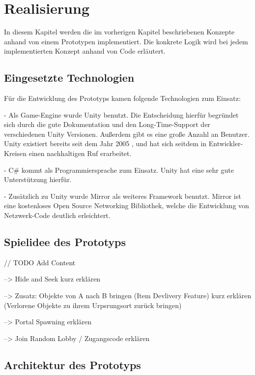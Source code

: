 \chapter{Realisierung}
\label{sec:realisierung}

In diesem Kapitel werden die im vorherigen Kapitel beschriebenen Konzepte anhand von einem Prototypen implementiert. Die konkrete Logik wird bei jedem implementierten Konzept anhand von Code erläutert.

\section{Eingesetzte Technologien}

Für die Entwicklung des Prototyps kamen folgende Technologien zum Einsatz:

- Als Game-Engine wurde Unity\cite{Technologies.03.02.2022} benutzt. Die Entscheidung hierfür begründet sich durch die gute Dokumentation und den Long-Time-Support der verschiedenen Unity Versionen. Außerdem gibt es eine große Anzahl an Benutzer. Unity existiert bereits seit dem Jahr 2005 \cite{Wikipedia.2022c}, und hat sich seitdem in Entwickler-Kreisen einen nachhaltigen Ruf erarbeitet.

- C\# kommt als Programmiersprache zum Einsatz. Unity hat eine sehr gute Unterstützung hierfür.

- Zusätzlich zu Unity wurde Mirror\cite{.03.02.2022} als weiteres Framework benutzt. Mirror ist eine kostenloses Open Source Networking Bibliothek, welche die Entwicklung von Netzwerk-Code deutlich erleichtert.

\section{Spielidee des Prototyps}
\label{Spielidee}

// TODO Add Content

--> Hide and Seek kurz erklären

--> Zusatz: Objekte von A nach B bringen (Item Devlivery Feature) kurz erklären (Verlorene Objekte zu ihrem Urpsrungsort zurück bringen)

--> Portal Spawning erklären

--> Join Random Lobby / Zugangscode erklären

\section{Architektur des Prototyps}
\label{Architektur}

